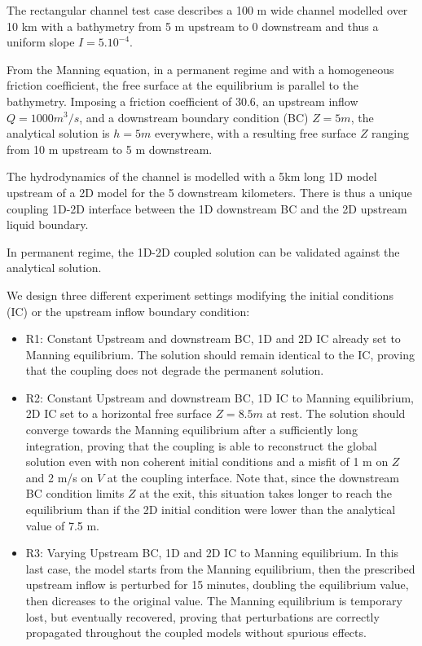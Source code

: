 The rectangular channel test case describes a 100 m wide channel
modelled over 10 km with a bathymetry from 5 m upstream to 0
downstream and thus a uniform slope $I = 5.10^{-4}$.

From the Manning equation, in a permanent regime and with a
homogeneous friction coefficient, the free surface at the equilibrium
is parallel to the bathymetry. Imposing a friction coefficient of
30.6, an upstream inflow $Q=1000 m^3/s$, and a downstream boundary
condition (BC) $Z=5 m$, the analytical solution is $h=5 m$ everywhere,
with a resulting free surface $Z$ ranging from 10 m upstream to 5 m
downstream.

The hydrodynamics of the channel is modelled with a 5km long 1D model
upstream of a 2D model for the 5 downstream kilometers. There is thus
a unique coupling 1D-2D interface between the 1D downstream BC and the
2D upstream liquid boundary.

In permanent regime, the 1D-2D coupled solution can be validated
against the analytical solution.

We design three different experiment settings modifying the initial
conditions (IC) or the upstream inflow boundary condition:
\begin{itemize}
\item R1: Constant Upstream and downstream BC, 1D and 2D IC already
  set to Manning equilibrium. The solution should remain identical to
  the IC, proving that the coupling does not degrade the permanent
  solution.
\item R2: Constant Upstream and downstream BC, 1D IC to Manning
  equilibrium, 2D IC set to a horizontal free surface $Z = 8.5 m$ at
  rest. The solution should converge towards the Manning equilibrium
  after a sufficiently long integration, proving that the coupling is
  able to reconstruct the global solution even with non coherent
  initial conditions and a misfit of 1 m on $Z$ and 2 m/s on $V$ at
  the coupling interface. Note that, since the downstream BC
  condition limits $Z$ at the exit, this situation takes longer to
  reach the equilibrium than if the 2D initial condition were lower
  than the analytical value of 7.5 m.
\item R3: Varying Upstream BC, 1D and 2D IC to Manning equilibrium. In
  this last case, the model starts from the Manning equilibrium, then
  the prescribed upstream inflow is perturbed for 15 minutes, doubling
  the equilibrium value, then dicreases to the original value. The
  Manning equilibrium is temporary lost, but eventually recovered,
  proving that perturbations are correctly propagated throughout the
  coupled models without spurious effects.
\end{itemize}

